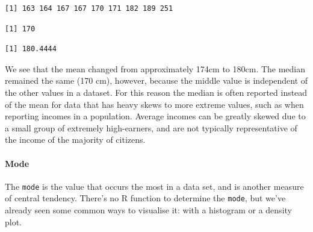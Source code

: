 \documentclass[
  letterpaper,
  DIV=11,
  numbers=noendperiod]{scrartcl}
\let\oldparagraph\paragraph
\renewcommand{\paragraph}[1]{\oldparagraph{#1}\mbox{}}
\newenvironment{Shaded}{\begin{snugshade}}{\end{snugshade}}
\newcommand{\FunctionTok}[1]{\textcolor[rgb]{0.28,0.35,0.67}{#1}}
\newcommand{\NormalTok}[1]{\textcolor[rgb]{0.00,0.23,0.31}{#1}}
\newcommand{\SpecialCharTok}[1]{\textcolor[rgb]{0.37,0.37,0.37}{#1}}
\begin{document}
\begin{Shaded}
\end{Shaded}

\begin{verbatim}
[1] 163 164 167 167 170 171 182 189 251
\end{verbatim}

\begin{Shaded}
\end{Shaded}

\begin{verbatim}
[1] 170
\end{verbatim}

\begin{Shaded}
\end{Shaded}

\begin{verbatim}
[1] 180.4444
\end{verbatim}

We see that the mean changed from approximately 174cm to 180cm. The
median remained the same (170 cm), however, because the middle value is
independent of the other values in a dataset. For this reason the median
is often reported instead of the mean for data that has heavy skews to
more extreme values, such as when reporting incomes in a population.
Average incomes can be greatly skewed due to a small group of extremely
high-earners, and are not typically representative of the income of the
majority of citizens.

\hypertarget{mode}{%
\paragraph{Mode}\label{mode}}

The \texttt{mode} is the value that occurs the most in a data set, and
is another measure of central tendency. There's no R function to
determine the \texttt{mode}, but we've already seen some common ways to
visualise it: with a histogram or a density plot.
\end{document}
